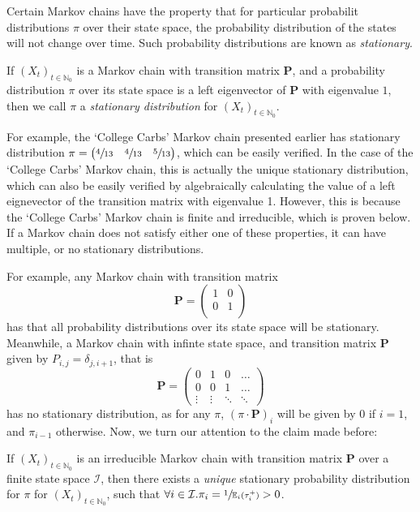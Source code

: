			Certain Markov chains have the property that for particular probabilit distributions $\pi$
			over their state space, the probability distribution of the states will not change over 
			time. Such probability distributions are known as \emph{stationary}.
			\begin{definition}
				If $(X_t)_{t \in \mathbb{N}_0}$ is a Markov chain with transition matrix 
				$\mathbf{P}$, and a probability distribution $\pi$ over its state space is a
				left eigenvector of $\mathbf{P}$ with eigenvalue $1$, then we call $\pi$ a 
				\emph{stationary distribution} for $(X_t)_{t \in \mathbb{N}_0}$.
			\end{definition}
			For example, the `College Carbs' Markov chain presented earlier has stationary 
			distribution $\pi = \begin{pmatrix} \sfrac{4}{13} & \sfrac{4}{13} & \sfrac{5}{13} 
			\end{pmatrix}$, which can be easily verified. In the case of the `College Carbs' Markov
			chain, this is actually the unique stationary distribution, which can also be easily 
			verified by algebraically calculating the value of a left eignevector of the transition 
			matrix with eigenvalue 1. However, this is because the `College Carbs' Markov chain is 
			finite and irreducible, which is proven below. If a Markov chain does not satisfy either 
			one of these properties, it can have multiple, or no stationary distributions. \par
			For example, any Markov chain with transition matrix 
			$$
				\mathbf{P} = 
				\begin{pmatrix}
					1 & 0 \\
					0 & 1 \\
				\end{pmatrix}
			$$
			has that all probability distributions over its state space will be stationary. Meanwhile,
			a Markov chain with infinte state space, and transition matrix $\mathbf{P}$ given by 
			$P_{i,j} = \delta_{j, i+1}$, that is
			$$
				\mathbf{P} =
				\begin{pmatrix}
					0      & 1 & 0 & \hdots \\
					0      & 0 & 1 & \hdots \\
					\vdots & \vdots & \ddots & \ddots 
				\end{pmatrix}
			$$
			has no stationary distribution, as for any $\pi$, $(\pi \cdot \mathbf{P})_i$ will be 
			given by $0$ if $i = 1$, and $\pi_{i-1}$ otherwise. Now, we turn our attention to the 
			claim made before:
			\begin{theorem}
				\label{theorem:uniquestationary}
				If $(X_t)_{t \in \mathbb{N}_0}$ is an irreducible Markov chain with transition 
				matrix $\mathbf{P}$ over a finite state space $\mathcal{I}$, then there exists
				a \emph{unique} stationary probability distribution for $\pi$ for $(X_t)_
				{t \in \mathbb{N}_0}$, such that $\forall i \in \mathcal{I}. \pi_i = \sfrac{1}
				{\mathbb{E}_i(\tau_i^+)} > 0$.
			\end{theorem}

